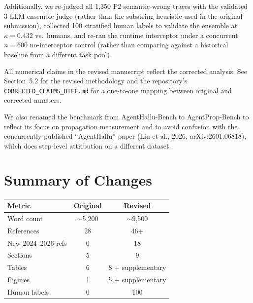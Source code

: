 \documentclass[11pt]{article}
\begin{document}
Additionally, we re-judged all 1,350 P2 semantic-wrong traces with the
validated 3-LLM ensemble judge (rather than the substring heuristic used
in the original submission), collected 100 stratified human labels to
validate the ensemble at $\kappa=0.432$ vs.\ humans, and re-ran the
runtime interceptor under a concurrent $n{=}600$ no-interceptor control
(rather than comparing against a historical baseline from a different
task pool).

All numerical claims in the revised manuscript reflect the corrected
analysis. See Section~5.2 for the revised methodology and the repository's
\texttt{CORRECTED\_CLAIMS\_DIFF.md} for a one-to-one mapping between
original and corrected numbers.

We also renamed the benchmark from AgentHallu-Bench to AgentProp-Bench
to reflect its focus on propagation measurement and to avoid confusion
with the concurrently published ``AgentHallu'' paper
(Liu et al., 2026, arXiv:2601.06818), which does step-level attribution
on a different dataset.

\section{Summary of Changes}

\begin{table}[h]
\centering\small
\begin{tabular}{lcc}
\toprule
Metric & Original & Revised \\
\midrule
Word count & $\sim$5,200 & $\sim$9,500 \\
References & 28 & 46+ \\
New 2024--2026 refs & 0 & 18 \\
Sections & 5 & 9 \\
Tables & 6 & 8 + supplementary \\
Figures & 1 & 5 + supplementary \\
Human labels & 0 & 100 \\
\bottomrule
\end{tabular}
\end{table}
\end{document}

